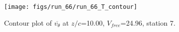 \begin{figure}[H]
\centering
\texttt{[image: figs/run\_66/run\_66\_T\_contour]}
\caption{Contour plot of $\overline{v_{\theta}}$ at $z/c$=10.00, $V_{free}$=24.96, station 7.}
\label{fig:run_66_T_contour}
\end{figure}


